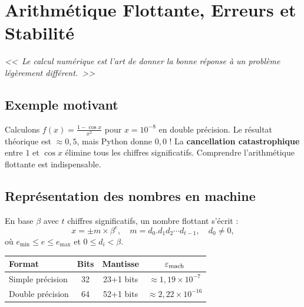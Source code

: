 \chapter{Arithm\'etique Flottante, Erreurs et Stabilit\'e}
\label{ch:flottants}

\begin{center}
\textit{<<~Le calcul num\'erique est l'art de donner la bonne r\'eponse \`a un probl\`eme l\'eg\`erement diff\'erent.~>>}
\end{center}

\section{Exemple motivant}

Calculons $f(x)=\frac{1-\cos x}{x^2}$ pour $x=10^{-8}$ en double pr\'ecision. Le r\'esultat th\'eorique est $\approx 0{,}5$, mais Python donne $0{,}0$ ! La \textbf{cancellation catastrophique} entre $1$ et $\cos x$ \'elimine tous les chiffres significatifs. Comprendre l'arithm\'etique flottante est indispensable.

\section{Repr\'esentation des nombres en machine}

\begin{definition}
En base $\beta$ avec $t$ chiffres significatifs, un nombre flottant s'\'ecrit :
\[
x = \pm m \times \beta^e, \quad m = d_0.d_1d_2\cdots d_{t-1}, \quad d_0\neq 0,
\]
o\`u $e_{\min}\leq e\leq e_{\max}$ et $0\leq d_i<\beta$.
\end{definition}

\begin{definition}
\begin{center}
\begin{tabular}{lccc}
\toprule
\textbf{Format} & \textbf{Bits} & \textbf{Mantisse} & \textbf{$\varepsilon_{\mathrm{mach}}$} \\
\midrule
Simple pr\'ecision & 32 & 23+1 bits & $\approx 1{,}19\times 10^{-7}$ \\
Double pr\'ecision & 64 & 52+1 bits & $\approx 2{,}22\times 10^{-16}$ \\
\bottomrule
\end{tabular}
\end{center}
\end{definition}

